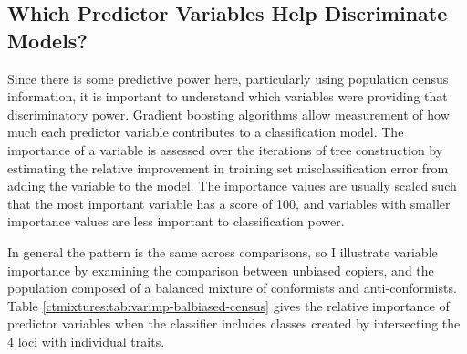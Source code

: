 \subsection{Which Predictor Variables Help Discriminate Models?}


Since there is some predictive power here, particularly using population census information, it is important to understand which variables were providing that discriminatory power.  
Gradient boosting algorithms allow measurement of how much each predictor variable contributes to a classification model.  The importance of a variable is assessed over the iterations of tree construction by estimating the relative improvement in training set misclassification error from adding the variable to the model.  The importance values are usually scaled such that the most important variable has a score of 100, and variables with smaller importance values are less important to classification power.  

In general the pattern is the same across comparisons, so I illustrate variable importance by examining the comparison between unbiased copiers, and the population composed of a balanced mixture of conformists and anti-conformists.  Table \ref{ctmixtures:tab:varimp-balbiased-census} gives the relative importance of predictor variables when the classifier includes classes created by intersecting the 4 loci with individual traits.

